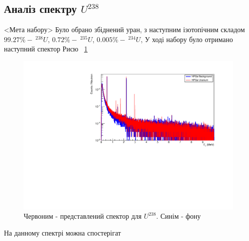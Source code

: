 \documentclass[a4paper, 14pt]{article}
\numberwithin{equation}{section}
\numberwithin{table}{section}
\begin{document}
\subsection{Аналіз спектру $U^{238}$}
	<Мета набору> Було обрано збіднений уран, з наступним ізотопічним складом $99.27\% -\  ^{238}U$, $ 0.72\% - \  ^{235}U$, $ 0.005\% - \ ^{234}U$, У ході набору було отримано наступний спектор Рисю ~\ref{ris:poorU}
	\begin{figure}[hbt!]
		\centering \includegraphics[width=1\textwidth]{res/poorUranium.pdf}
		\caption{Червоним - представлений спектор для $U^{238}$. Синім - фону} 
		\label{ris:poorU}	
	\end{figure} 	 
	На данному спектрі можна спостерігат
	
\end{document}
